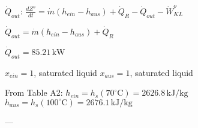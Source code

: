 \( \dot{Q}_{out} \):  
\( \frac{dZ^o}{dt} = \dot{m} (h_{ein} - h_{aus}) + \dot{Q}_R - \dot{Q}_{out} - \dot{W}^o_{KL} \)  

\( \dot{Q}_{out} = \dot{m} (h_{ein} - h_{aus}) + \dot{Q}_R \)  

\( \dot{Q}_{out} = 85.21 \, \text{kW} \)  

\( x_{ein} = 1 \), saturated liquid  
\( x_{aus} = 1 \), saturated liquid  

From Table A2:  
\( h_{ein} = h_s(70^\circ \text{C}) = 2626.8 \, \text{kJ/kg} \)  
\( h_{aus} = h_s(100^\circ \text{C}) = 2676.1 \, \text{kJ/kg} \)  

---